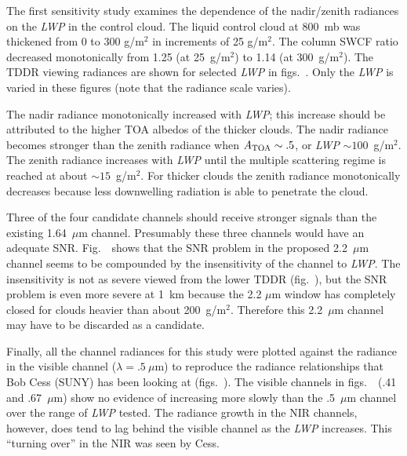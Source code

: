 The first sensitivity study examines the dependence of the
nadir/zenith radiances on the {\it LWP\/} in the control cloud.
The liquid control cloud at 800~mb was thickened from 0 to 300 g/m$^2$
in increments of 25 g/m$^2$. 
The column SWCF ratio decreased monotonically from 1.25 (at
25~g/m$^2$) to 1.14 (at 300~g/m$^2$).
The TDDR viewing radiances are shown for selected {\it LWP\/} in
figs.~.
Only the {\it LWP\/} is varied in these figures
(note that the radiance scale varies).

The nadir radiance monotonically increased with {\it LWP\/}; this
increase should be attributed to   
the higher TOA albedos of the thicker clouds. 
The nadir radiance becomes stronger than the zenith radiance when
$A_{\rm {TOA}} \sim .5$, or {\it LWP\/} $\sim 100$~g/m$^2$.
The zenith radiance increases with {\it LWP\/} until the multiple
scattering regime is reached at about $\sim 15$~g/m$^2$.
For thicker clouds
the zenith radiance monotonically decreases because less downwelling
radiation is able to penetrate the cloud.

Three of the four candidate channels should receive stronger signals
than the existing 1.64~$\mu$m channel.
Presumably these three channels would have an adequate SNR.
Fig.~\ shows
that the SNR problem in the proposed 2.2~$\mu$m channel seems to
be compounded by the insensitivity of the channel to {\it LWP\/}.  
The insensitivity is not as severe viewed from the lower TDDR
(fig.~\/), 
but the SNR problem is even more severe at 1~km because
the 2.2 $\mu$m window has completely closed for clouds heavier than 
about 200~g/m$^2$.
Therefore this 2.2~$\mu$m channel may have to be discarded
as a candidate.

Finally, all the channel radiances for this study were plotted against
the radiance in the visible channel ($\lambda = .5~\mu$m) to reproduce
the radiance relationships that Bob Cess (SUNY) has been looking at 
(figs.~\/).
The visible channels in figs.~\ 
(.41 and .67~$\mu$m) show no evidence of 
increasing more slowly than the .5~$\mu$m channel over the range of
{\it LWP\/} tested.
The radiance growth in the NIR channels, however, does tend to 
lag behind the visible channel as the {\it LWP\/} increases. 
This ``turning over'' in the NIR was seen by Cess. 
\medskip
{}\nobreak

